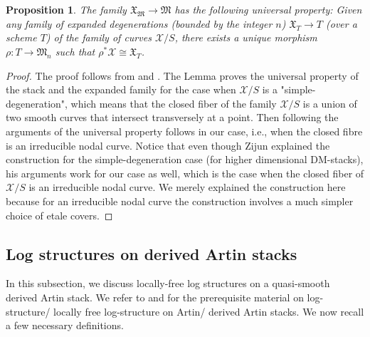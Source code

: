\documentclass[11pt]{amsart}
\theoremstyle{plain}
\numberwithin{equation}{section}
\theoremstyle{definition}
\theoremstyle{plain}
\newtheorem{Prop}[Def]{Proposition}
\begin{document}
\begin{Prop}
    The family $\mathfrak{X}_\mathfrak{M} \to \mathfrak{M}$ has the following universal property: Given any family of expanded degenerations (bounded by the integer $n$) $\mathfrak X_T\to T$ (over a scheme $T$) of the family of curves $\mathcal X/S$, there exists a unique morphism $\rho: T\to \mathfrak M_n$ such that $\rho^*\mathcal X\cong \mathfrak X_T$. 
\end{Prop}

\begin{proof}
    The proof follows from \cite[Lemma 1.8. , Definition 1.9., Proposition 1.10.]{Li} and \cite[2.3 Standard families of expanded degenerations and pairs – gluing, and 2.5 Stacks of expanded degenerations and pairs]{Z}. The Lemma \cite[Lemma 1.8.]{Li} proves the universal property of the stack and the expanded family for the case when $\mathcal X/S$ is a "simple-degeneration", which means that the closed fiber of the family $\mathcal X/S$ is a union of two smooth curves that intersect transversely at a point. Then following the arguments of \cite[2.3 Standard families of expanded degenerations and pairs – gluing, and 2.5 Stacks of expanded degenerations and pairs]{Z} the universal property follows in our case, i.e., when the closed fibre is an irreducible nodal curve. Notice that even though Zijun explained the construction for the simple-degeneration case (for higher dimensional DM-stacks), his arguments work for our case as well, which is the case when the closed fiber of $\mathcal X/S$ is an irreducible nodal curve. We merely explained the construction here because for an irreducible nodal curve the construction involves a much simpler choice of etale covers.
\end{proof}

\smallskip

\subsection{\textbf{Log structures on derived Artin stacks}}
In this subsection, we discuss locally-free log structures on a quasi-smooth derived Artin stack. We refer to \cite{26,27} and \cite{Pr} for the prerequisite material on log-structure/ locally free log-structure on Artin/ derived Artin stacks. We now recall a few necessary definitions.
\end{document}
